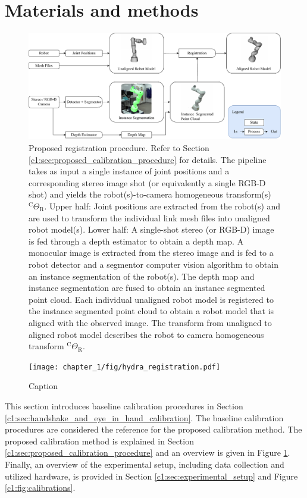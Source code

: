 \section{Materials and methods}
\label{c1:sec:materials_and_methods}
\begin{figure}
    \centering
    \includegraphics[width=\textwidth]{chapter_1/fig/approach_refined.pdf}
    \caption{Proposed registration procedure. Refer to Section \ref{c1:sec:proposed_calibration_procedure} for details. The pipeline takes as input a single instance of joint positions and a corresponding stereo image shot (or equivalently a single RGB-D shot) and yields the robot(s)-to-camera homogeneous transform(s) $^\text{C}\Theta_\text{R}$. Upper half: Joint positions are extracted from the robot(s) and are used to transform the individual link mesh files into unaligned robot model(s).
    Lower half:
    A single-shot stereo (or RGB-D) image is fed through a depth estimator to obtain a depth map.
    A monocular image is extracted from the stereo image and is fed to a robot detector and a segmentor computer vision algorithm to obtain an instance segmentation of the robot(s).
    The depth map and instance segmentation are fused to obtain an instance segmented point cloud.
    Each individual unaligned robot model is registered to the instance segmented point cloud to obtain a robot model that is aligned with the observed image. The transform from unaligned to aligned robot model describes the robot to camera homogeneous transform $^\text{C}\Theta_\text{R}$.}
    \label{c1:fig:calibration_pipeline}
\end{figure}

\begin{figure}
    \centering
    \texttt{[image: chapter\_1/fig/hydra\_registration.pdf]}
    \caption{Caption}
    \label{c1:fig:hydra_registration}
\end{figure}

This section introduces baseline calibration procedures in Section \ref{c1:sec:handshake_and_eye_in_hand_calibration}. The baseline calibration procedures are considered the reference for the proposed calibration method. The proposed calibration method is explained in Section \ref{c1:sec:proposed_calibration_procedure} and an overview is given in Figure \ref{c1:fig:calibration_pipeline}. Finally, an overview of the experimental setup, including data collection and utilized hardware, is provided in Section \ref{c1:sec:experimental_setup} and Figure \ref{c1:fig:calibrations}.

